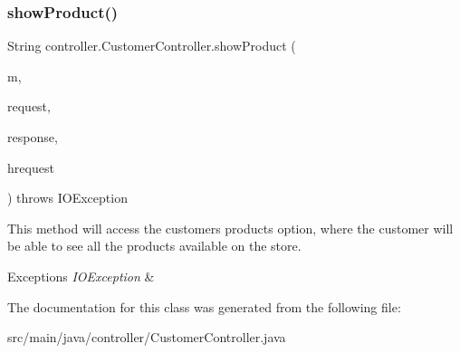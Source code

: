 \subsubsection{\texorpdfstring{show\+Product()}{showProduct()}}
{\footnotesize\ttfamily String controller.\+Customer\+Controller.\+show\+Product (\begin{DoxyParamCaption}\item[{Model}]{m,  }\item[{Web\+Request}]{request,  }\item[{Http\+Servlet\+Response}]{response,  }\item[{Http\+Servlet\+Request}]{hrequest }\end{DoxyParamCaption}) throws I\+O\+Exception\hspace{0.3cm}{\ttfamily [inline]}}

This method will access the customer\textquotesingle{}s \textquotesingle{}products\textquotesingle{} option, where the customer will be able to see all the products available on the store. 
\begin{DoxyExceptions}{Exceptions}
{\em I\+O\+Exception} & \\
\hline
\end{DoxyExceptions}


The documentation for this class was generated from the following file\+:\begin{DoxyCompactItemize}
\item 
src/main/java/controller/Customer\+Controller.\+java\end{DoxyCompactItemize}
